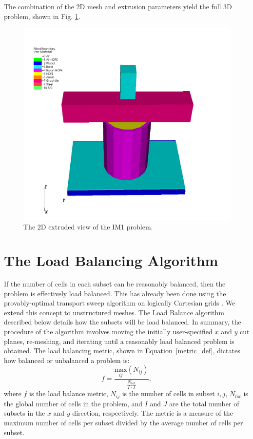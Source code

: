 \documentclass{anstrans}
\begin{document}
The combination of the 2D mesh and extrusion parameters yield the full 3D problem, shown in Fig. \ref{IM13D}.
   
\begin{figure}[H]
\centering
\includegraphics[scale = 0.3]{figures/IM1_3D.png}
\caption{The 2D extruded view of the IM1 problem.}
\label{IM13D}
\end{figure}


\section{The Load Balancing Algorithm}

If the number of cells in each subset can be reasonably balanced, then the problem is effectively load balanced. This has already been done using  the provably-optimal transport sweep algorithm on logically Cartesian grids \cite{mpadams2015}.  We extend this concept to unstructured meshes. The Load Balance algorithm described below details how the subsets will be load balanced. In summary, the procedure of the algorithm involves moving the initially user-specified $x$ and $y$ cut planes, re-meshing, and iterating until a reasonably load balanced problem is obtained.  The load balancing metric, shown in Equation~\eqref{metric_def}, dictates how balanced or unbalanced a problem is:
\begin{equation}
f =\frac{\underset{ij}{\text{max}}(N_{ij})}{\frac{N_{tot}}{I\cdot J}},
\label{metric_def}
\end{equation}
where $f$ is the load balance metric, $N_{ij}$ is the number of cells in subset $i,j$, $N_{tot}$ is the global number of cells in the problem, and $I$ and $J$ are the total number of subsets in the $x$ and $y$ direction, respectively. The metric is a measure of the maximum number of cells per subset divided by the average number of cells per subset.
\end{document}
